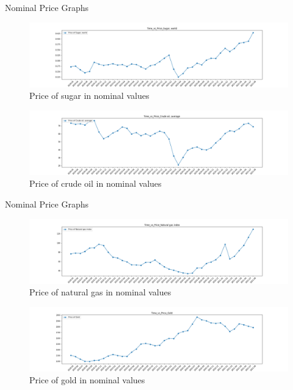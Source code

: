 \begin{frame}{Nominal Price Graphs}
  \begin{figure} [H]
	\begin{center}
		\includegraphics[scale=0.2]{images/illustrate/Time_vs_Price_Sugar, world.png}
	\end{center}
	\caption{Price of sugar in nominal values}
	\label{fig:log-archi}
\end{figure}
\begin{figure} [H]
	\begin{center}
		\includegraphics[scale=0.2]{images/illustrate/Time_vs_Price_Crude oil, average.png}
	\end{center}
	\caption{Price of crude oil in nominal values}
	\label{fig:log-archi}
\end{figure}
\end{frame}

\begin{frame}{Nominal Price Graphs}
  \begin{figure} [H]
	\begin{center}
		\includegraphics[scale=0.2]{images/illustrate/Time_vs_Price_Natural gas index.png}
	\end{center}
	\caption{Price of natural gas in nominal values}
	\label{fig:log-archi}
\end{figure}
\begin{figure} [H]
	\begin{center}
		\includegraphics[scale=0.2]{images/illustrate/Time_vs_Price_Gold.png}
	\end{center}
	\caption{Price of gold in nominal values}
	\label{fig:log-archi}
\end{figure}
\end{frame}



